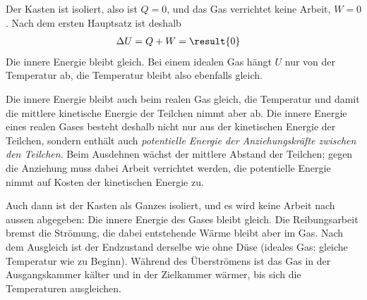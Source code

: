 \begin{abcliste}
\abc Der Kasten ist isoliert, also ist $Q = 0$, und das Gas verrichtet keine Arbeit, $W = 0$. Nach dem ersten Hauptsatz ist deshalb
\begin{align}
 \Delta U &= Q + W = \result{0}
\end{align}
Die innere Energie bleibt gleich. Bei einem idealen Gas hängt $U$ nur von der Temperatur ab, die Temperatur bleibt also ebenfalls gleich.

\abc Die innere Energie bleibt auch beim realen Gas gleich, die Temperatur und damit die mittlere kinetische Energie der Teilchen nimmt aber ab. Die innere Energie eines realen Gases besteht deshalb nicht nur aus der kinetischen Energie der Teilchen, sondern enthält auch \emph{potentielle Energie der Anziehungskräfte zwischen den Teilchen}. Beim Ausdehnen wächst der mittlere Abstand der Teilchen; gegen die Anziehung muss dabei Arbeit verrichtet werden, die potentielle Energie nimmt auf Kosten der kinetischen Energie zu.

\abc Auch dann ist der Kasten als Ganzes isoliert, und es wird keine Arbeit nach aussen abgegeben: Die innere Energie des Gases bleibt gleich. Die Reibungsarbeit bremst die Strömung, die dabei entstehende Wärme bleibt aber im Gas. Nach dem Ausgleich ist der Endzustand derselbe wie ohne Düse (ideales Gas: gleiche Temperatur wie zu Beginn). Während des Überströmens ist das Gas in der Ausgangskammer kälter und in der Zielkammer wärmer, bis sich die Temperaturen ausgleichen.
\end{abcliste}
